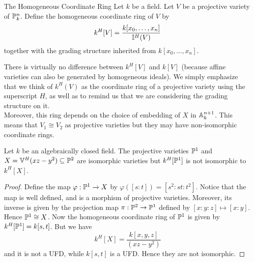 \documentclass[a4paper]{article}
\begin{document}
\begin{defn}{The Homogeneous Coordinate Ring}{} Let $k$ be a field. Let $V$ be a projective variety of $\mathbb{P}_k^n$. Define the homogeneous coordinate ring of $V$ by $$k^H[V]=\frac{k[x_0,\dots,x_n]}{\mathbb{I}^H(V)}$$ together with the grading structure inherited from $k[x_0,\dots,x_n]$. 
\end{defn}

There is virtually no difference between $k^H[V]$ and $k[V]$ (because affine varieties can also be generated by homogeneous ideals). We simply emphasize that we think of $k^H(V)$ as the coordinate ring of a projective variety using the superscript $H$, as well as to remind us that we are considering the grading structure on it. \\

Moreover, this ring depends on the choice of embedding of $X$ in $\mathbb{A}_k^{n+1}$. This means that $V_1\cong V_2$ as projective varieties but they may have non-isomorphic coordinate rings. 

\begin{eg}{}{} Let $k$ be an algebraically closed field. The projective varieties $\mathbb{P}^1$ and $X=\mathbb{V}^H(xz-y^2)\subseteq\mathbb{P}^2$ are isomorphic varieties but $k^H[\mathbb{P}^1]$ is not isomorphic to $k^H[X]$. \tcbline
\begin{proof}
Define the map $\varphi:\mathbb{P}^1\to X$ by $\varphi([s:t])=[s^2:st:t^2]$. Notice that the map is well defined, and is a morphism of projective varieties. Moreover, its inverse is given by the projection map $\pi:\mathbb{P}^2\to\mathbb{P}^1$ defined by $[x:y:z]\mapsto[x:y]$. Hence $\mathbb{P}^1\cong X$. Now the homogeneous coordinate ring of $\mathbb{P}^1$ is given by $k^H[\mathbb{P}^1]=k[s,t]$. But we have $$k^H[X]=\frac{k[x,y,z]}{(xz-y^2)}$$ and it is not a UFD, while $k[s,t]$ is a UFD. Hence they are not isomorphic. 
\end{proof}
\end{eg}
\end{document}
